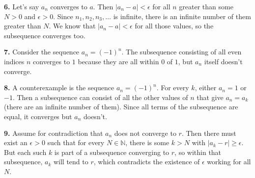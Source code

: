 \documentclass{article}
\begin{document}
\textbf{6.} Let's say $a_n$ converges to $a$. Then $|a_n - a| < \epsilon$ for all $n$ greater than some $N > 0$ and $\epsilon > 0$. Since $n_1, n_2, n_3, \ldots$ is infinite, there is an infinite number of them greater than $N$. We know that $|a_n - a| < \epsilon$ for all those values, so the subsequence converges too.
\newline

\textbf{7.} Consider the sequence $a_n = (-1)^n$. The subsequence consisting of all even indices $n$ converges to $1$ because they are all within $0$ of $1$, but $a_n$ itself doesn't converge.
\newline

\textbf{8.} A counterexample is the sequence $a_n = (-1)^n$. For every $k$, either $a_n = 1$ or $-1$. Then a subsequence can consist of all the other values of $n$ that give $a_n = a_k$ (there are an infinite number of them). Since all terms of the subsequence are equal, it converges but $a_n$ doesn't.
\newline

\textbf{9.} Assume for contradiction that $a_n$ does not converge to $r$. Then there must exist an $\epsilon > 0$ such that for every $N \in \mathbb{N}$, there is some $k > N$ with $|a_k - r| \ge \epsilon$. But each such $k$ is part of a subsequence converging to $r$, so within that subsequence, $a_k$ will tend to $r$, which contradicts the existence of $\epsilon$ working for all $N$.
\end{document}
